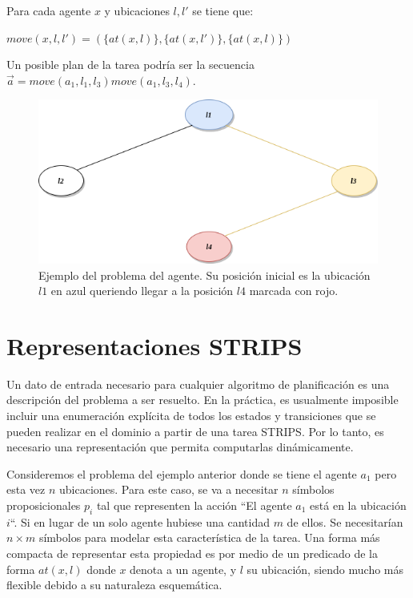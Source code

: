 Para cada agente $x$ y ubicaciones $l, l'$ se tiene que:
\begin{center}
    $move(x, l, l') = (\{at(x, l)\}, \{at(x, l')\}, \{at(x, l)\})$
\end{center}

Un posible plan de la tarea podría ser la secuencia $\vec{a} = move(a_1, l_1, l_3)move(a_1, l_3, l_4)$.

\begin{figure}
    \centering
    \includegraphics[scale=0.5]{figures/agent_example.png}
    \caption{Ejemplo del problema del agente. Su posición inicial es la ubicación
             $l1$ en azul queriendo llegar a la posición $l4$ marcada con rojo.}
    \label{fig:agent_example}
\end{figure}

\section{Representaciones STRIPS}

Un dato de entrada necesario para cualquier algoritmo de planificación es una
descripción del problema a ser resuelto. En la práctica, es usualmente imposible
incluir una enumeración explícita de todos los estados y transiciones que se
pueden realizar en el dominio a partir de una tarea STRIPS. Por lo tanto, es
necesario una representación que permita computarlas dinámicamente.

Consideremos el problema del ejemplo anterior donde se tiene el agente $a_1$
pero esta vez $n$ ubicaciones. Para este caso, se va a necesitar $n$ símbolos
proposicionales $p_i$ tal que representen la acción ``El agente $a_1$ está en la
ubicación $i$``. Si en lugar de un solo agente hubiese una cantidad $m$ de
ellos. Se necesitarían $n \times m$ símbolos para modelar esta característica de
la tarea. Una forma más compacta de representar esta propiedad es por medio de
un predicado de la forma $at(x, l)$ donde $x$ denota a un agente, y $l$ su
ubicación, siendo mucho más flexible debido a su naturaleza esquemática.


